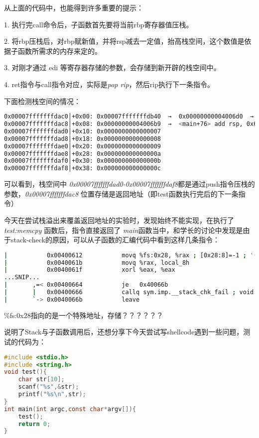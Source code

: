 \documentclass[12pt]{article}  %
\begin{document}
从上面的代码中，也能得到许多重要的提示：\par
1. 执行完call命令后，子函数首先要将当前rbp寄存器值压栈。\par
2. 将rbp压栈后，对rbp赋新值，并将rsp减去一定值，抬高栈空间，这个数值是依据子函数所需求的内存来定的。\par
3. 对刚才通过 edi 等寄存器存储的参数，会存储到新开辟的栈空间中。\par
4. ret指令与call指令对应，实际是\emph{pop rip}，然后rip执行下一条指令。\par
下面检测栈空间的情况：
\begin{lstlisting}[language=sh]
0x00007fffffffdac0│+0x00: 0x00007fffffffdb40  →  0x00000000004006d0  →  <__libc_csu_init+0> push r15	 ← $rsp, $rbp
0x00007fffffffdac8│+0x08: 0x00000000004006b9  →  <main+76> add rsp, 0x60
0x00007fffffffdad0│+0x10: 0x0000000000000007
0x00007fffffffdad8│+0x18: 0x0000000000000008
0x00007fffffffdae0│+0x20: 0x0000000000000009
0x00007fffffffdae8│+0x28: 0x000000000000000a
0x00007fffffffdaf0│+0x30: 0x000000000000000b
0x00007fffffffdaf8│+0x38: 0x000000000000000c
\end{lstlisting}\par
可以看到，栈空间中 \emph{0x00007fffffffdad0-0x00007fffffffdaf8}都是通过push指令压栈的参数，\emph{0x00007fffffffdac8} 位置存储是返回地址（即test函数执行完后的下一条指令）\par
今天在尝试栈溢出来覆盖返回地址的实验时，发现始终不能实现，在执行了\emph{test:memcpy} 函数后，指令直接返回了 \emph{main}函数当中，和学长的讨论中发现是由于stack-check的原因，可以从子函数的汇编代码中看到这样几条指令：
\begin{lstlisting}[language=sh]
|           0x00400612           movq %fs:0x28, %rax ; [0x28:8]=-1 ; '(' ; 40
|           0x0040061b           movq %rax, local_8h
|           0x0040061f           xorl %eax, %eax
...SNIP...
|       ,=< 0x00400664           je   0x40066b
|       |   0x00400666           callq sym.imp.__stack_chk_fail ; void __stack_chk_fail(void)
|       `-> 0x0040066b           leave
\end{lstlisting}\par
\%fs:0x28指向的是一个特殊地址，存储？？？？？？ \par
说明了Stack与子函数调用后，还想分享下今天尝试写shellcode遇到一些问题，测试的代码为：
\begin{lstlisting}[language=c]
#include <stdio.h>
#include <string.h>
void test(){
    char str[10];
    scanf("%s",&str);
    printf("%s\n",str);
}
int main(int argc,const char*argv[]){
    test();
    return 0;
}
\end{lstlisting}\par
\end{document}
